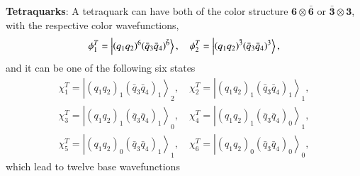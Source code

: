 \documentclass[12pt,onecolumn,floatfix,nofootinbib]{revtex4}
\begin{document}
\textbf{Tetraquarks}: A tetraquark can have both of the color structure $%
\boldsymbol{6}\otimes \boldsymbol{\bar{6}}$ or $\boldsymbol{\bar{3}}\otimes
\boldsymbol{3}$, with the respective color wavefunctions,
\begin{equation}
\phi _{1}^{T}=\left\vert {\left( q_{1}q_{2}\right) }^{6}{\left( \bar{q}_{3}%
\bar{q}_{4}\right) }^{\bar{6}}\right\rangle ,\quad \phi _{2}^{T}=\left\vert {%
\left( q_{1}q_{2}\right) }^{\bar{3}}{\left( \bar{q}_{3}\bar{q}_{4}\right) }%
^{3}\right\rangle ,  \label{colorT}
\end{equation}%
and it can be one of the following six states
\begin{equation}
\begin{aligned} \chi_{1}^{T}={\left| {\left(q_{1}q_{2}\right)}_{1}
{\left(\bar{q}_{3}\bar{q}_{4}\right)}_{1} \right\rangle}_{2}, \quad
\chi_{2}^{T}={\left| {\left(q_{1}q_{2}\right)}_{1}
{\left(\bar{q}_{3}\bar{q}_{4}\right)}_{1} \right\rangle}_{1}, \\
\chi_{3}^{T}={\left| {\left(q_{1}q_{2}\right)}_{1}
{\left(\bar{q}_{3}\bar{q}_{4}\right)}_{1} \right\rangle}_{0}, \quad
\chi_{4}^{T}={\left| {\left(q_{1}q_{2}\right)}_{1}
{\left(\bar{q}_{3}\bar{q}_{4}\right)}_{0} \right\rangle}_{1}, \\
\chi_{5}^{T}={\left| {\left(q_{1}q_{2}\right)}_{0}
{\left(\bar{q}_{3}\bar{q}_{4}\right)}_{1} \right\rangle}_{1}, \quad
\chi_{6}^{T}={\left| {\left(q_{1}q_{2}\right)}_{0}
{\left(\bar{q}_{3}\bar{q}_{4}\right)}_{0} \right\rangle}_{0}, \end{aligned}
\label{spinT}
\end{equation}%
which lead to twelve base wavefunctions
\end{document}
